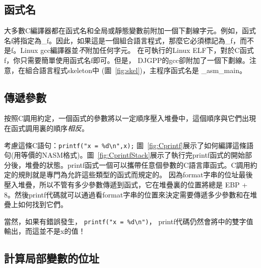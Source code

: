 \subsection{函式名}
大多數C編譯器都在函式名和全局或靜態變數前附加一個下劃線字元。例如，函式名{\code f}將指定為{\code \_f}。因此，如果這是一個組合語言程式，那麼它必須標記為{\code \_f}，而不是{\code f}。Linux gcc編譯器並\emph{不}附加任何字元。
在可執行的Linux ELF下，對於C函式{\code f}，你只需要簡單使用函式名{\code f}即可。但是，
 DJGPP的gcc卻附加了一個下劃線。注意，在組合語言程式skeleton中
(圖~\ref{fig:skel})，主程序函式名是{\code
\_asm\_main}。

\subsection{傳遞參數}
按照C調用約定，一個函式的參數將以一定順序壓入堆疊中，這個順序與它們出現在函式調用裏的順序\emph{相反}。

考慮這條C語句：\verb|printf("x = %d\n",x);|
圖~\ref{fig:Cprintf}展示了如何編譯這條語句(用等價的NASM格式)。圖~\ref{fig:CprintfStack}展示了執行完{\code printf}函式的開始部分後，堆疊的狀態。{\code printf}函式一個可以攜帶任意個參數的C語言庫函式。C調用約定的規則就是專門為允許這些類型的函式而規定的。 因為format字串的位址最後壓入堆疊，所以不管有多少參數傳遞到函式，它在堆疊裏的位置將總是
{\code EBP + 8}。然後{\code printf}代碼就可以通過看format字串的位置來決定需要傳遞多少參數和在堆疊上如何找到它們。

當然，如果有錯誤發生， \verb|printf("x = %d\n")|，
{\code printf}代碼仍然會將{\code [EBP + 12]}中的雙字值輸出，而這並不是{\code x}的值！

\subsection{計算局部變數的位址}

